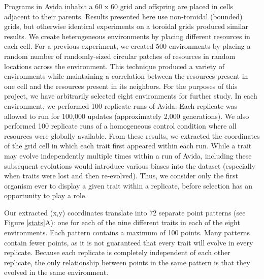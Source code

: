 Programs in Avida inhabit a 60 x 60 grid and offspring are placed in cells adjacent to their parents. Results presented here use non-toroidal (bounded) grids, but otherwise identical experiments on a toroidal grids produced similar results.  We create heterogeneous environments by placing different resources in each cell. For a previous experiment, %
we created 500 environments by placing a random number of randomly-sized circular patches of resources in random locations across the environment. This technique produced a variety of environments while maintaining a correlation between the resources present in one cell and the resources present in its neighbors. For the purposes of this project, we have arbitrarily selected eight environments for further study. %
In each environment, we performed 100 replicate runs of Avida. Each replicate was allowed to run for 100,000 updates (approximately 2,000 generations). We also performed 100 replicate runs of a homogeneous control condition where all resources were globally available. From these results, we extracted the coordinates of the grid cell in which each trait first appeared within each run. While a trait may evolve independently multiple times within a run of Avida, including these subsequent evolutions would introduce various biases into the dataset (especially when traits were lost and then re-evolved). Thus, we consider only the first organism ever to display a given trait within a replicate, before selection has an opportunity to play a role.

Our extracted (x,y) coordinates translate into 72 separate point patterns (see Figure \ref{stats}A): one for each of the nine different traits in each of the eight environments. Each pattern contains a maximum of 100 points. Many patterns contain fewer points, as it is not guaranteed that every trait will evolve in every replicate. Because each replicate is completely independent of each other replicate, the only relationship between points in the same pattern is that they evolved in the same environment.

